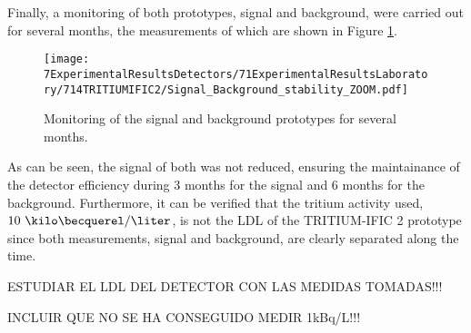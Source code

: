 
Finally, a monitoring of both prototypes, signal and background, were carried out for several months, the measurements of which are shown in Figure \ref{fig:MonitorizationTRITIUMIFIC2}.

\begin{figure}[h]
\centering
\texttt{[image: 7ExperimentalResultsDetectors/71ExperimentalResultsLaboratory/714TRITIUMIFIC2/Signal\_Background\_stability\_ZOOM.pdf]}
\caption{Monitoring of the signal and background prototypes for several months.\label{fig:MonitorizationTRITIUMIFIC2}}
\end{figure}

As can be seen, the signal of both was not reduced, ensuring the maintainance of the detector efficiency during 3 months for the signal and 6 months for the background. Furthermore, it can be verified that the tritium activity used, $10~\kilo\becquerel/\liter$, is not the LDL of the TRITIUM-IFIC 2 prototype since both measurements, signal and background, are clearly separated along the time.

ESTUDIAR EL LDL DEL DETECTOR CON LAS MEDIDAS TOMADAS!!!

INCLUIR QUE NO SE HA CONSEGUIDO MEDIR 1kBq/L!!!






